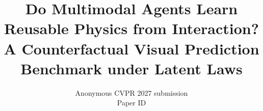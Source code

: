 \documentclass[10pt,twocolumn,letterpaper]{article}
\title{Do Multimodal Agents Learn Reusable Physics from Interaction?\\
A Counterfactual Visual Prediction Benchmark under Latent Laws}
\author{Anonymous CVPR 2027 submission\\
Paper ID \paperID\\
}
\begin{document}
\maketitle









{
    \small
    
    
}

% 
\end{document}
